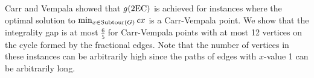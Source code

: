 Carr and Vempala \cite{Carr2004} showed that $g(\2ec)$ is achieved for instances where the optimal solution to $\min_{x\in \operatorname{{Subtour}}(G)}cx$ is a Carr-Vempala point. We show that the integrality gap is at most $\frac{6}{5}$ for Carr-Vempala points with at most 12 vertices on the cycle formed by the fractional edges.
 
Note that the number of vertices in these instances can be arbitrarily high since the paths of edges with $x$-value 1 can be arbitrarily long.




